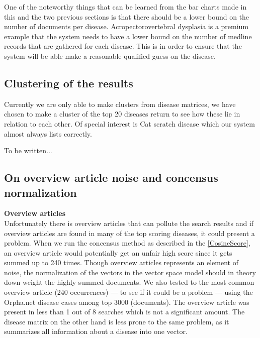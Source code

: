 One of the noteworthy things that can be learned from the bar charts made in this and 
the two previous sections is that there should be a lower bound on the number of documents 
per disease. Acropectorovertebral dysplasia is a premium example that the system needs to 
have a lower bound on the number of medline records that are gathered for each disease. 
This is in order to ensure that the system will be able make a reasonable qualified guess 
on the disease.

\subsection{Clustering of the results}
Currently we are only able to make clusters from disease matrices, we have chosen to make a cluster 
of the top 20 diseases return to see how these lie in relation to each other. Of special interest is 
Cat scratch disease which our system almost always lists correctly. 



To be written...

\subsection{On overview article noise and concensus normalization\label{Overview}}

\textbf{Overview articles}\\
Unfortunately there is overview articles that can pollute the search results and if overview articles are 
found in many of the top scoring diseases, it could present a problem. When we run the concensus method as 
described in the \ref{CosineScore}, an overview article would potentially get an unfair high score since it 
gets summed up to 240 times. Though overview articles represents an element of noise, the normalization of 
the vectors in the vector space model should in theory down weight the highly summed documents. We also 
tested to the most common overview article (240 occurrences) --- to see if it could be a problem --- using the 
Orpha.net disease cases among top 3000 (documents). The overview article was present in less than 1 out of 
8 searches which is not a significant amount. The disease matrix on the other hand is less prone to the same 
problem, as it summarizes all information about a disease into one vector. \\

